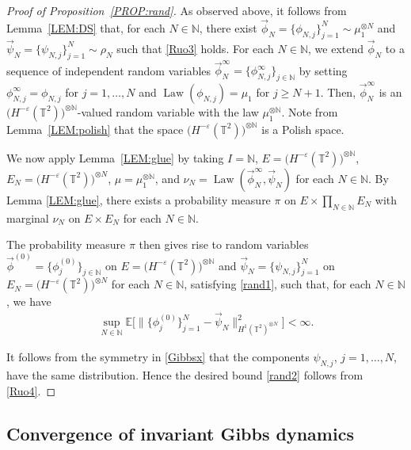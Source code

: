 \documentclass[letterpaper, 11pt,  reqno]{amsart}
\DeclareMathOperator{\Law}{Law}
\newcommand{\1}{\hspace{0.5mm}\text{I}\hspace{0.2mm}}
\newcommand{\noi}{\noindent}
\newcommand{\T}{\mathbb{T}}
\newcommand{\N}{\mathbb{N}}
\newcommand{\E}{\mathbb{E}}
\newcommand{\eps}{\varepsilon}
\newcommand{\muN}{\mu_1^{\otimes N}}
\numberwithin{equation}{section}
\numberwithin{theorem}{section}
\begin{document}
\begin{proof}[Proof of Proposition~\ref{PROP:rand}]


As observed above, 
it follows from 
Lemma~\ref{LEM:DS}
that, for each $N \in \N$, 
there exist
$\vec \phi_N =  \{\phi_{N, j}\}_{j = 1}^N \sim \muN$ 
and   $\vec \psi_N = \{\psi_{N, j}\}_{j = 1}^N \sim \rho_N$
such that \eqref{Ruo3} holds.
For each $N \in \N$, we extend 
$\vec \phi_N$ to 
a sequence of independent random variables
$\vec \phi^\infty_{N} = \{\phi_{N, j}^\infty\}_{j \in \N}$
by setting
$\phi_{N, j}^\infty = \phi_{N, j}$ for $j = 1, \dots, N$
and $\Law(\phi_{N, j}) =  \mu_1$
for $j \ge  N+1$.
Then, 
$\vec \phi^\infty_N$
is an $\big(H^{- \eps} (\T^2)\big)^{\otimes \N}$-valued random variable
with the law $\mu_1^{\otimes \N}$. 
Note 
from  Lemma~\ref{LEM:polish}
that the space $\big(H^{- \eps} (\T^2)\big)^{\otimes \N}$ is a Polish space.

We now apply Lemma~\ref{LEM:glue} by taking $I = \N$, 
$E = \big(H^{-\eps} (\T^2)\big)^{\otimes \N}$, 
$E_N = \big(H^{- \eps} (\T^2)\big)^{\otimes N}$, 
  $\mu = \mu_1^{\otimes \N}$, 
and  $\nu_N = \Law (\vec \phi_N^\infty, \vec \psi_N)$ for each $N \in \N$.
By Lemma \ref{LEM:glue}, 
there exists 
 a probability measure $\pi$ on $E \times \prod_{N \in \N} E_N$ with marginal $\nu_N$ on $E \times E_N$ for each $N \in \N$. 
 
 
 
 The probability measure $\pi$ then gives rise to random variables 
 $\vec \phi^{(0)} =  \big\{\phi^{(0)}_j\big\}_{j \in \N}$ on $E =\big( H^{-\eps} (\T^2)\big)^{\otimes \N}$ 
 and $\vec \psi_N = \{\psi_{N, j}\}_{j = 1}^N$ on $E_N = \big(H^{- \eps} (\T^2)\big)^{\otimes N}$ for each $N \in \N$, 
 satisfying \eqref{rand1}, 
 such that,  for each $N \in \N$, we have
\begin{align}
\sup_{N \in \N}\E \Big[ \big\| \big\{\phi^{(0)}_j\big\}_{j = 1}^N - \vec \psi_N \big\|_{H^1 (\T^2)^{\otimes N}}^2 \Big] 
< \infty.
\label{Ruo4}
\end{align}

\noi
It follows  from the symmetry in \eqref{Gibbsx}
that the components $\psi_{N, j}$,  $j = 1, \dots, N$,  have the same distribution. 
Hence  the desired bound \eqref{rand2} follows from  \eqref{Ruo4}.
\end{proof}










\subsection{Convergence of invariant Gibbs dynamics}
\label{SUBSEC:6.2}
\end{document}
